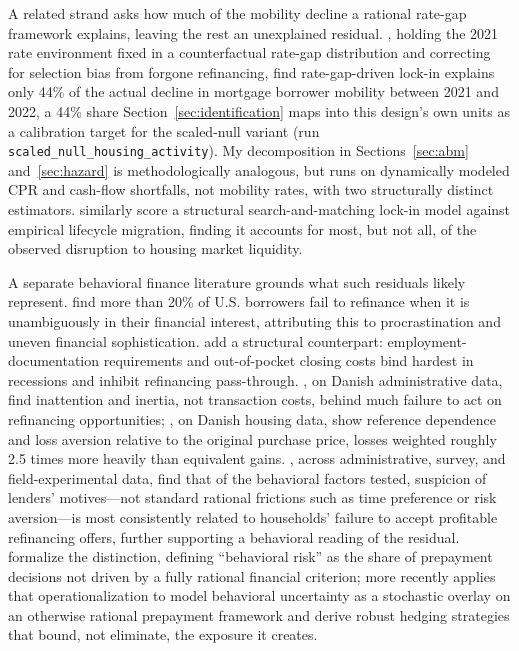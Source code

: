 \documentclass[12pt]{article}
\begin{document}
A related strand asks how much of the mobility decline a rational rate-gap framework explains, leaving the rest an unexplained residual. \citet{aladangady2024}, holding the 2021 rate environment fixed in a counterfactual rate-gap distribution and correcting for selection bias from forgone refinancing, find rate-gap-driven lock-in explains only 44\% of the actual decline in mortgage borrower mobility between 2021 and 2022, a 44\% share Section~\ref{sec:identification} maps into this design's own units as a calibration target for the scaled-null variant (run \texttt{scaled\_null\_housing\_activity}). My decomposition in Sections~\ref{sec:abm} and~\ref{sec:hazard} is methodologically analogous, but runs on dynamically modeled CPR and cash-flow shortfalls, not mobility rates, with two structurally distinct estimators. \citet{gerardi2024} similarly score a structural search-and-matching lock-in model against empirical lifecycle migration, finding it accounts for most, but not all, of the observed disruption to housing market liquidity.

A separate behavioral finance literature grounds what such residuals likely represent. \citet{keys2016} find more than 20\% of U.S. borrowers fail to refinance when it is unambiguously in their financial interest, attributing this to procrastination and uneven financial sophistication. \citet{defusco2020} add a structural counterpart: employment-documentation requirements and out-of-pocket closing costs bind hardest in recessions and inhibit refinancing pass-through. \citet{andersen2020}, on Danish administrative data, find inattention and inertia, not transaction costs, behind much failure to act on refinancing opportunities; \citet{andersen2022}, on Danish housing data, show reference dependence and loss aversion relative to the original purchase price, losses weighted roughly 2.5 times more heavily than equivalent gains. \citet{johnson2019}, across administrative, survey, and field-experimental data, find that of the behavioral factors tested, suspicion of lenders' motives---not standard rational frictions such as time preference or risk aversion---is most consistently related to households' failure to accept profitable refinancing offers, further supporting a behavioral reading of the residual. \citet{bissiri2014} formalize the distinction, defining ``behavioral risk'' as the share of prepayment decisions not driven by a fully rational financial criterion; \citet{perotti2024} more recently applies that operationalization to model behavioral uncertainty as a stochastic overlay on an otherwise rational prepayment framework and derive robust hedging strategies that bound, not eliminate, the exposure it creates.
\end{document}
